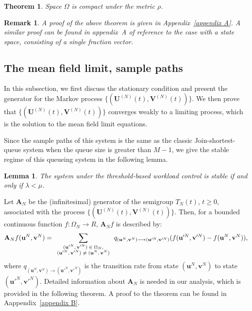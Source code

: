 \documentclass[12pt]{article}
\newtheorem{theorem}{Theorem}[section]
\newtheorem{remark}{Remark}[section]
\newtheorem{lemma}{Lemma}[section]
\begin{document}
\begin{theorem}\label{space}
Space $\Omega$ is compact under the metric $\rho$.
\end{theorem}

\begin{remark} A proof of the above theorem is given in Appendix~\ref{appendix A}. A similar proof can be found in appendix~A of reference \cite{AM} to the case with a state space, consisting of a single fraction vector.
\end{remark}


\subsection{The mean field limit, sample paths}

In this subsection, we first discuss the stationary condition and present the generator for the Markov process $\displaystyle \{(\textbf{U}^{(N)}(t), \textbf{V}^{(N)}(t))\}$. We then prove that $\displaystyle \{(\textbf{U}^{(N)}(t), \textbf{V}^{(N)}(t))\}$ converges weakly to a limiting process, which is the solution to the mean field limit equations.

Since the sample paths of this system is the same as the classic Join-shortest-queue system when the queue size is greater than $M-1$, we give the stable regime of this queueing system in the following lemma.%

\begin{lemma}
The system under the threshold-based workload control is stable if and only if $\lambda<\mu$.
\end{lemma}



Let $\mathbf{A}_{N}$ be the (infinitesimal) generator of the semigroup $T_N(t)$, $t\geq0$, associated with the process $\displaystyle \{(\textbf{U}^{(N)}(t), \textbf{V}^{(N)}(t))\}$.   Then, for a bounded continuous function $f: \Omega_{N} \rightarrow R $,  $\mathbf{A}_{N}f$ is described by:
\begin{equation}\label{Ant}
 \displaystyle\mathbf{A}_{N}f(\textbf{u}^N,\textbf{v}^N)=\sum\limits_{\displaystyle \scriptsize \begin{array}{c}
                                                            (\textbf{u}'^N,\textbf{v}'^N)\in\Omega_{N}, \\
                                                            (\textbf{u}'^N,\textbf{v}'^N)\neq (\textbf{u}^N,\textbf{v}^N)
                                                          \end{array}
}\displaystyle q_{(\textbf{u}^N,\textbf{v}^N)\longrightarrow(\textbf{u}'^N,\textbf{v}'^N)}(f(\textbf{u}'^N,\textbf{v}'^N)-f(\textbf{u}^N,\textbf{v}^N)),
\end{equation}
where $q_{(\textbf{u}^N,\textbf{v}^N)\longrightarrow(\textbf{u}'^N,\textbf{v}'^N)}$ is the transition rate from state $(\textbf{u}^N,\textbf{v}^N)$ to state $(\textbf{u}'^N,\textbf{v}'^N)$. Detailed information about $\mathbf{A}_{N}$ is needed in our analysis, which is provided in the following theorem. A proof to the theorem can be found in Aappendix~\ref{appendix B}.
\end{document}
